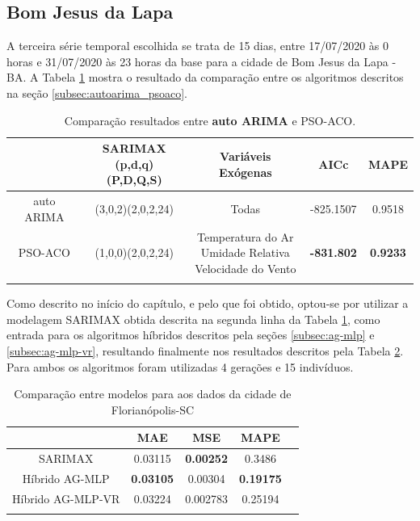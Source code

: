\subsection{Bom Jesus da Lapa}

A terceira série temporal escolhida se trata de 15 dias, entre 17/07/2020 às 0 horas e 31/07/2020 às 23 horas da base para a cidade de Bom Jesus da Lapa - BA. A Tabela \ref{tab:cap4_comp_bjl_autoarima_psoaco} mostra o resultado da comparação entre os algoritmos descritos na seção \ref{subsec:autoarima_psoaco}.

\begin{table}[htbp]
\caption{Comparação resultados entre \textbf{auto ARIMA} e PSO-ACO.}
\begin{center}
\begin{tabular}{ccccc}
                    & \Longstack{SARIMAX \\ (p,d,q)(P,D,Q,S)} & Variáveis Exógenas & AICc & MAPE  \\\hline
auto ARIMA & (3,0,2)(2,0,2,24) & Todas & -825.1507 & 0.9518 \\\hline
PSO-ACO             & (1,0,0)(2,0,2,24) & \Longstack{Temperatura do Ar \\ Umidade Relativa \\ Velocidade do Vento} & \textbf{-831.802} & \textbf{0.9233} \\\hline
\label{tab:cap4_comp_bjl_autoarima_psoaco}
\end{tabular}
\end{center}
\end{table}

Como descrito no início do capítulo, e pelo que foi obtido, optou-se por utilizar a modelagem SARIMAX obtida descrita na segunda linha da Tabela \ref{tab:cap4_comp_bjl_autoarima_psoaco}, como entrada para os algoritmos híbridos descritos pela seções \ref{subsec:ag-mlp} e \ref{subsec:ag-mlp-vr}, resultando finalmente nos resultados descritos pela Tabela \ref{tab:cap4_comp_bjl_agmlp_agmlpvr}. Para ambos os algoritmos foram utilizadas 4 gerações e 15 indivíduos.

\begin{table}[htbp]
\caption{Comparação entre modelos para aos dados da cidade de Florianópolis-SC}
\begin{center}
\begin{tabular}{ccccc}
                & MAE & MSE & MAPE \\\hline
SARIMAX         & 0.03115 & \textbf{0.00252} & 0.3486 \\\hline
Híbrido AG-MLP  & \textbf{0.03105} & 0.00304 & \textbf{0.19175} \\\hline
Híbrido AG-MLP-VR & 0.03224 & 0.002783 & 0.25194 \\\hline
\label{tab:cap4_comp_bjl_agmlp_agmlpvr}
\end{tabular}
\end{center}
\end{table}

